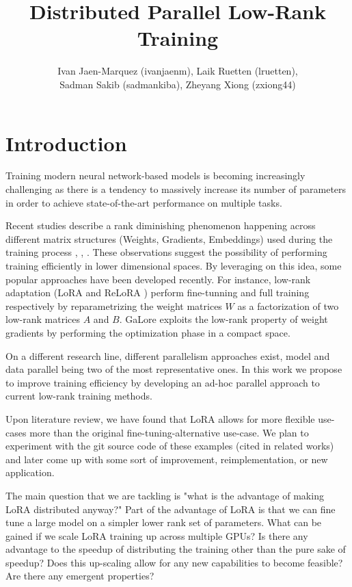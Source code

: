 \documentclass[pdftex,twocolumn,10pt,letterpaper]{article}
\begin{document}
\title{Distributed Parallel Low-Rank Training}
\author{Ivan Jaen-Marquez (ivanjaenm), Laik Ruetten (lruetten), \\ Sadman Sakib (sadmankiba), Zheyang Xiong (zxiong44)}

\date{}


\maketitle

\section{Introduction}

Training modern neural network-based models is becoming increasingly challenging as there is a tendency to massively increase its number of parameters in order to achieve state-of-the-art performance on multiple tasks.

Recent studies describe a rank diminishing phenomenon happening across different matrix structures (Weights, Gradients, Embeddings) used during the training process \cite{huh2023simplicitybias}, \cite{9782552}, \cite{le2022training}. These observations suggest the possibility of performing training efficiently in lower dimensional spaces. By leveraging on this idea, some popular approaches have been developed recently. For instance, low-rank adaptation (LoRA  \cite{Hu2021LoRA} and ReLoRA \cite{lialin2023relora}) perform fine-tunning and full training respectively by reparametrizing the weight matrices $W$ as a factorization of two low-rank matrices $A$ and $B$. GaLore \cite{zhao2024galore} exploits the low-rank property of weight gradients by performing the optimization phase in a compact space.

On a different research line, different parallelism approaches exist, model and data parallel being two of the most representative ones. In this work we propose to improve training efficiency by developing an ad-hoc parallel approach to current low-rank training methods.


Upon literature review, we have found that LoRA allows for more flexible use-cases more than the original fine-tuning-alternative use-case. We plan to experiment with the git source code of these examples (cited in related works) and later come up with some sort of improvement, reimplementation, or new application.

The main question that we are tackling is "what is the advantage of making LoRA distributed anyway?" Part of the advantage of LoRA is that we can fine tune a large model on a simpler lower rank set of parameters. What can be gained if we scale LoRA training up across multiple GPUs? Is there any advantage to the speedup of distributing the training other than the pure sake of speedup? Does this up-scaling allow for any new capabilities to become feasible? Are there any emergent properties?
\end{document}
